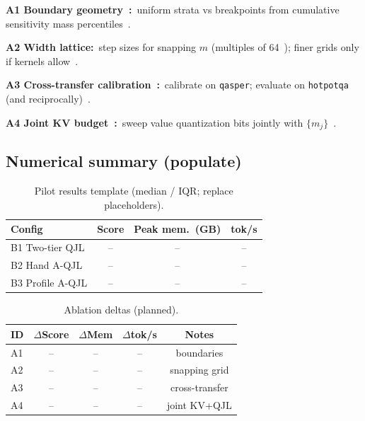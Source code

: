 \documentclass[conference]{IEEEtran}
\begin{document}
\textbf{A1 Boundary geometry~\cite{touvron2023llama}:}\ uniform strata vs breakpoints from cumulative sensitivity mass percentiles~\cite{presentation_mqjl}.

\textbf{A2 Width lattice:}\ step sizes for snapping \(m\) (multiples of 64~\cite{zandieh2024qjl}); finer grids only if kernels allow~\cite{zandieh2024aqjl-repo}.

\textbf{A3 Cross-transfer calibration~\cite{presentation_mqjl}:}\ calibrate on \texttt{qasper}; evaluate on \texttt{hotpotqa} (and reciprocally)~\cite{bai2023longbench}.

\textbf{A4 Joint KV budget~\cite{kivi2024}:}\ sweep value quantization bits jointly with \(\{m_j\}\)~\cite{kivi2024}.

\subsection{Numerical summary (populate)}

\newcommand{\TblNA}{--}

\begin{table}[t]
\caption{Pilot results template (median / IQR; replace placeholders).}
\label{tbl:results}
\begin{center}
\begin{tabular}{lccc}
\hline
Config & Score & Peak mem.\ (GB) & tok/s \\
\hline
B1 Two-tier QJL & \TblNA & \TblNA & \TblNA \\
B2 Hand A-QJL & \TblNA & \TblNA & \TblNA \\
B3 Profile A-QJL & \TblNA & \TblNA & \TblNA \\
\hline
\end{tabular}
\end{center}
\end{table}

\begin{table}[t]
\caption{Ablation deltas (planned).}
\label{tbl:abla}
\begin{center}
\begin{tabular}{lcccc}
\hline
ID & \(\Delta\)Score & \(\Delta\)Mem & \(\Delta\)tok/s & Notes \\
\hline
A1 & \TblNA & \TblNA & \TblNA & boundaries \\
A2 & \TblNA & \TblNA & \TblNA & snapping grid \\
A3 & \TblNA & \TblNA & \TblNA & cross-transfer \\
A4 & \TblNA & \TblNA & \TblNA & joint KV+QJL \\
\hline
\end{tabular}
\end{center}
\end{table}
\end{document}
